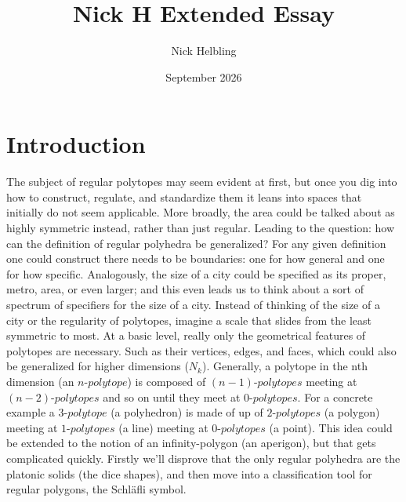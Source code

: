 \documentclass{article}
\title{Nick H Extended Essay}
\author{Nick Helbling}
\date{September 2026}
\begin{document}
\maketitle

\section{Introduction}
The subject of regular polytopes may seem evident at first, but once you dig into how to construct, 
regulate, and standardize them it leans into spaces that initially do not seem applicable. 
More broadly, the area could be talked about as highly symmetric instead, rather than just regular. 
Leading to the question: how can the definition of regular polyhedra be generalized? For any given definition one could construct there needs to be boundaries: 
one for how general and one for how specific. Analogously, the size of a city could be specified as its proper, metro, area, or even larger; 
and this even leads us to think about a sort of spectrum of specifiers for the size of a city. 
Instead of thinking of the size of a city or the regularity of polytopes, imagine a scale that slides from the least symmetric to most. 
At a basic level, really only the geometrical features of polytopes are necessary. Such as their vertices, edges, and faces, 
which could also be generalized for higher dimensions ($N_k$). Generally, a polytope in the nth dimension (an $n$-$polytope$) is composed of $(n-1)$-$polytopes$ 
meeting at $(n-2)$-$polytopes$ and so on until they meet at \mbox{$0$-$polytopes$}. For a concrete example a $3$-$polytope$ (a polyhedron) is made of up of $2$-$polytopes$ 
(a polygon) meeting at $1$-$polytopes$ (a line) meeting at $0$-$polytopes$ (a point). 
This idea could be extended to the notion of an infinity-polygon (an aperigon), but that gets complicated quickly. 
Firstly we'll disprove that the only regular polyhedra are the platonic solids (the dice shapes), and then move into a classification tool for regular polygons, 
the Schläfli symbol. 
\end{document}
